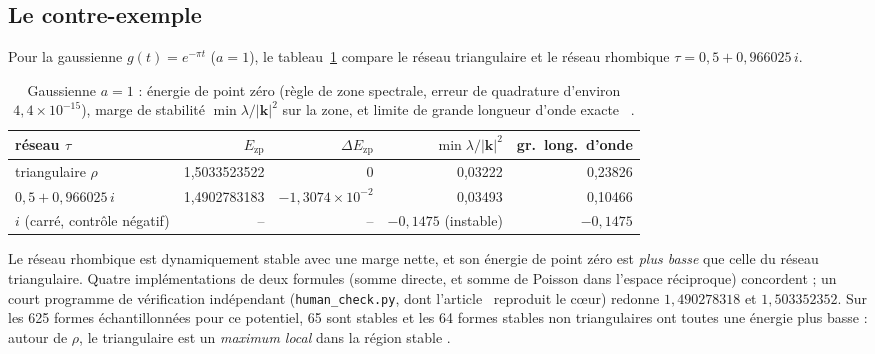 \subsection{Le contre-exemple \tierX}\label{ch3:sec:contreex}
Pour la gaussienne $g(t)=e^{-\pi t}$ ($a=1$), le tableau~\ref{ch3:tab:head} compare le réseau triangulaire et le réseau
rhombique $\tau=0{,}5+0{,}966025\,i$.
\begin{table}[ht]\centering\small
\caption{Gaussienne $a=1$ : énergie de point zéro (règle de zone spectrale, erreur de quadrature
d'environ $4{,}4\times10^{-15}$), marge de stabilité $\min\lambda/|\mathbf k|^2$ sur la zone, et limite de grande
longueur d'onde exacte \tierX~\cite{ch3-p2zp}.}\label{ch3:tab:head}
\begin{tabular}{lrrrr}\toprule
réseau $\tau$ & $E_{\mathrm{zp}}$ & $\Delta E_{\mathrm{zp}}$ & $\min\lambda/|\mathbf k|^2$ & gr.\ long.\ d'onde\\\midrule
triangulaire $\rho$ & 1,5033523522 & 0 & 0,03222 & 0,23826\\
$0{,}5+0{,}966025\,i$ & 1,4902783183 & $-1{,}3074\times10^{-2}$ & 0,03493 & 0,10466\\
$i$ (carré, contrôle négatif) & -- & -- & $-0{,}1475$ (instable) & $-0{,}1475$\\
\bottomrule\end{tabular}
\end{table}

\noindent Le réseau rhombique est dynamiquement stable avec une marge nette, et son énergie de point zéro est
\emph{plus basse} que celle du réseau triangulaire. Quatre implémentations de deux formules (somme directe, et somme de
Poisson dans l'espace réciproque) concordent ; un court programme de vérification indépendant
(\texttt{human\_check.py}, dont l'article~\cite{ch3-p2zp} reproduit le cœur) redonne $1{,}490278318$ et $1{,}503352352$. Sur les 625 formes échantillonnées pour ce
potentiel, 65 sont stables et les 64 formes stables non triangulaires ont toutes une énergie plus basse : autour de
$\rho$, le triangulaire est un \emph{maximum local} dans la région stable \tierX.

